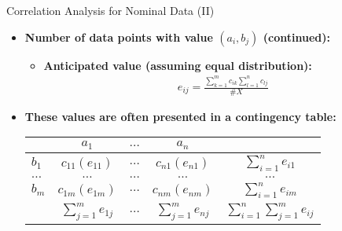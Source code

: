 \begin{frame}{Correlation Analysis for Nominal Data (II)}
	\begin{itemize}
		\item \textbf{Number of data points with value $(a_i,b_j)$ (continued):}
		\begin{itemize}
			\item \textbf{Anticipated value (assuming equal distribution):}
			\begin{align}
				e_{ij} = \frac{\sum_{k=1}^{m} c_{ik}\sum_{l=1}^{n}c_{lj}}{\#X}
			\end{align} 
		\end{itemize}
		\item \textbf{These values are often presented in a 
		\color{airforceblue}contingency table:} \\
		\centering
		\vspace{5mm}
		\begin{tabular}{l|c|c|c|c|}
			& $a_1$ & $\ldots$ & $a_n$ &  
			\\\hline
			$b_1$ & $c_{11} (e_{11})$ & $\ldots$ & $c_{n1} (e_{n1})$ & 
			$\sum_{i=1}^n e_{i1}$  
			\\\hline
			$\ldots$ & $\ldots$ & $\ldots$ 	& $\ldots$ & $\ldots$ 
			\\\hline
			$b_m$ & $c_{1m} (e_{1m})$ & $\ldots$ & $c_{nm} (e_{nm})$ & 
			$\sum_{i=1}^n e_{im}$  
			\\\hline
			& $\sum_{j=1}^m e_{1j}$ & $\ldots$ & $\sum_{j=1}^m 
			e_{nj}$ &  $\sum_{i=1}^n\sum_{j=1}^m e_{ij}$
			\\\hline
		\end{tabular}
	\end{itemize}
\end{frame}

